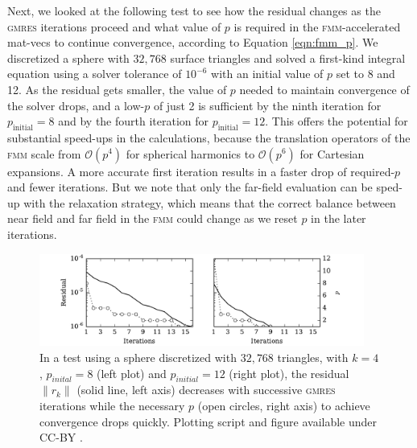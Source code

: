 \documentclass[final,3p,times]{elsarticle}
\newcommand{\fmm}{\textsc{fmm}\xspace}
\newcommand{\bigO}{\mathcal{O}}
\newcommand{\gmres}{\textsc{gmres}\xspace}
\begin{document}
Next, we looked at the following test to see how the residual changes as the \gmres iterations proceed and  what value of $p$ is required in the \fmm-accelerated mat-vecs to continue convergence, according to Equation \eqref{eqn:fmm_p}. We discretized a sphere with $32,768$ surface triangles and solved a first-kind integral equation using a solver tolerance of $10^{-6}$ with an initial value of $p$ set to 8 and 12. As the residual gets smaller, the value of $p$ needed to maintain convergence of the solver drops, and a low-$p$ of just 2 is sufficient by the ninth iteration for $p_\text{{initial}}=8$ and by the fourth iteration for $p_{\text{initial}}=12$. This offers the potential for substantial speed-ups in the calculations, because the translation operators of the \fmm scale from $\bigO(p^{4})$ for spherical harmonics to $\bigO(p^{6})$ for Cartesian expansions. A more accurate first iteration results in a faster drop of required-$p$ and fewer iterations. 
But we note that only the far-field evaluation can be sped-up with the relaxation strategy, which means that the correct balance between near field and far field in the \fmm could change as we reset $p$ in the later iterations.

\begin{figure}%
	\centering
	\includegraphics[natwidth=7in,natheight=2in,width=0.95\textwidth]{LaplaceResidualIterations.pdf}
	\caption{In a test using a sphere discretized with $32,768$ triangles, with $k=4$, $p_{inital}=8$ (left plot) and $p_{initial}=12$ (right plot), the residual $\|r_{k}\|$  (solid line, left axis) decreases with successive \gmres iterations while the necessary $p$ (open circles, right axis) to achieve convergence drops quickly. Plotting script and figure available under CC-BY \cite{WangLaytonBarba2016-figshare2}.}
	\label{fig:residualp}
\end{figure}
\end{document}
